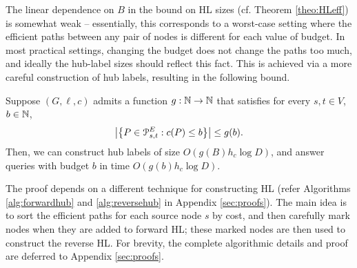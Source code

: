\label{sec:frontier}

The linear dependence on $B$ in the bound on HL sizes (cf. Theorem \ref{theo:HLeff}) is somewhat weak -- essentially, this corresponds to a worst-case setting where the efficient paths between any pair of nodes is different for each value of budget. In most practical settings, changing the budget does not change the paths too much, and ideally the hub-label sizes should reflect this fact. This is achieved via a more careful construction of hub labels, resulting in the following bound. 
\begin{theorem}
\label{thm:markedhubs}
Suppose $(G,\ell,c)$ admits a function $g:\N\to \N$ that satisfies for every $s,t\in V$, $b\in \N$,
\[
\abs*{\crl*{P\in\Pst^E: c(P)\leq b}} \leq g(b).
\]
Then, we can construct hub labels of size $O(g(B)h_c\log D)$, and answer queries with budget $b$ in time $O(g(b)h_c\log D)$.
\end{theorem}

The proof depends on a different technique for constructing HL (refer Algorithms \ref{alg:forwardhub} and \ref{alg:reversehub} in Appendix \ref{sec:proofs}). The main idea is to sort the efficient paths for each source node $s$ by cost, and then carefully mark nodes when they are added to forward HL; these marked nodes are then used to construct the reverse HL.
For brevity, the complete algorithmic details and proof are deferred to Appendix \ref{sec:proofs}.


